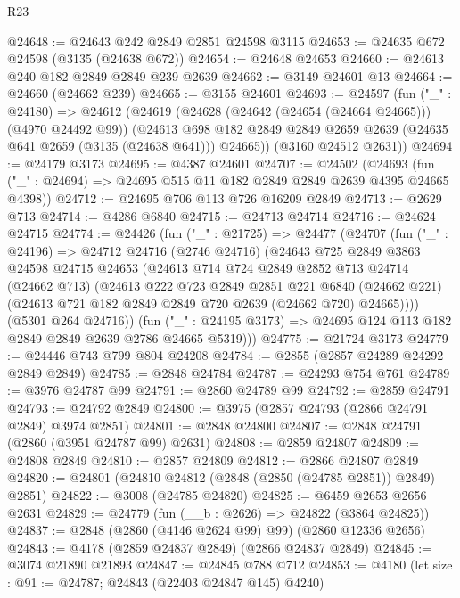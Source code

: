 \begin{lexlean}{R23}
\begin{coremodule}
@24648 := @24643 @242 @2849 @2851 @24598 @3115
@24653 := @24635 @672 @24598 (@3135 (@24638 @672))
@24654 := @24648 @24653
@24660 := @24613 @240 @182 @2849 @2849 @239 @2639
@24662 := @3149 @24601 @13
@24664 := @24660 (@24662 @239)
@24665 := @3155 @24601
@24693 := @24597
    (fun ("_" : @24180) =>
    @24612
      (@24619
        (@24628 (@24642 (@24654 (@24664 @24665))) (@4970 @24492 @99))
        (@24613 @698 @182 @2849 @2849 @2659 @2639 (@24635 @641 @2659 (@3135 (@24638 @641))) @24665))
      (@3160 @24512 @2631))
@24694 := @24179 @3173
@24695 := @4387 @24601
@24707 := @24502
    (@24693 (fun ("_" : @24694) => @24695 @515 @11 @182 @2849 @2849 @2639 @4395 @24665 @4398))
@24712 := @24695 @706 @113 @726 @16209 @2849
@24713 := @2629 @713
@24714 := @4286 @6840
@24715 := @24713 @24714
@24716 := @24624 @24715
@24774 := @24426
    (fun ("_" : @21725) =>
    @24477
      (@24707
        (fun ("_" : @24196) =>
        @24712
          @24716
          (@2746 @24716)
          (@24643
            @725
            @2849
            @3863
            @24598
            @24715
            @24653
            (@24613
              @714
              @724
              @2849
              @2852
              @713
              @24714
              (@24662 @713)
              (@24613
                @222
                @723
                @2849
                @2851
                @221
                @6840
                (@24662 @221)
                (@24613 @721 @182 @2849 @2849 @720 @2639 (@24662 @720) @24665))))
          (@5301 @264 @24716))
        (fun ("_" : @24195 @3173) => @24695 @124 @113 @182 @2849 @2849 @2639 @2786 @24665 @5319)))
@24775 := @21724 @3173
@24779 := @24446 @743 @799 @804 @24208
@24784 := @2855 (@2857 @24289 @24292 @2849 @2849)
@24785 := @2848 @24784
@24787 := @24293 @754 @761
@24789 := @3976 @24787 @99
@24791 := @2860 @24789 @99
@24792 := @2859 @24791
@24793 := @24792 @2849
@24800 := @3975 (@2857 @24793 (@2866 @24791 @2849) @3974 @2851)
@24801 := @2848 @24800
@24807 := @2848 @24791 (@2860 (@3951 @24787 @99) @2631)
@24808 := @2859 @24807
@24809 := @24808 @2849
@24810 := @2857 @24809
@24812 := @2866 @24807 @2849
@24820 := @24801 (@24810 @24812 (@2848 (@2850 (@24785 @2851)) @2849) @2851)
@24822 := @3008 (@24785 @24820)
@24825 := @6459 @2653 @2656 @2631
@24829 := @24779 (fun (__b : @2626) => @24822 (@3864 @24825))
@24837 := @2848 (@2860 (@4146 @2624 @99) @99) (@2860 @12336 @2656)
@24843 := @4178 (@2859 @24837 @2849) (@2866 @24837 @2849)
@24845 := @3074 @21890 @21893
@24847 := @24845 @788 @712
@24853 := @4180 (let size : @91 := @24787; @24843 (@22403 @24847 @145) @4240)

\end{coremodule}
\end{lexlean}
